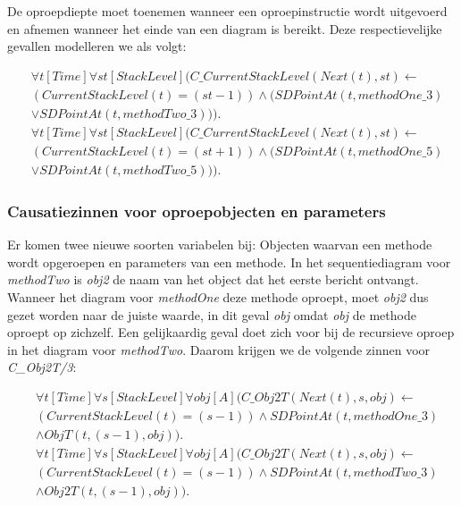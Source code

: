 De oproepdiepte moet toenemen wanneer een oproepinstructie wordt uitgevoerd en afnemen wanneer het einde van een diagram is bereikt. Deze respectievelijke gevallen modelleren we als volgt:

\begin{align}
	\nonumber &\forall{t}[Time]\forall{st}[StackLevel](C\_CurrentStackLevel(Next(t), st) \leftarrow \\ \nonumber &(CurrentStackLevel(t) = (st-1)) \land (SDPointAt(t, methodOne\_3) \\ &\lor SDPointAt(t, methodTwo\_3))). \\
	\nonumber &\forall{t}[Time]\forall{st}[StackLevel](C\_CurrentStackLevel(Next(t), st) \leftarrow \\ \nonumber &(CurrentStackLevel(t) = (st+1)) \land (SDPointAt(t, methodOne\_5) \\ &\lor SDPointAt(t, methodTwo\_5))).
\end{align}

\subsubsection{Causatiezinnen voor oproepobjecten en parameters}
Er komen twee nieuwe soorten variabelen bij: Objecten waarvan een methode wordt opgeroepen en parameters van een methode. In het sequentiediagram voor \textit{methodTwo} is \textit{obj2} de naam van het object dat het eerste bericht ontvangt. Wanneer het diagram voor \textit{methodOne} deze methode oproept, moet \textit{obj2} dus gezet worden naar de juiste waarde, in dit geval \textit{obj} omdat \textit{obj} de methode oproept op zichzelf. Een gelijkaardig geval doet zich voor bij de recursieve oproep in het diagram voor \textit{methodTwo}. Daarom krijgen we de volgende zinnen voor \textit{C\_Obj2T/3}:

\begin{align}
	\nonumber &\forall{t}[Time]\forall{s}[StackLevel]\forall{obj}[A](C\_Obj2T(Next(t), s, obj) \leftarrow
	\\ \nonumber &(CurrentStackLevel(t) = (s-1)) \land SDPointAt(t, methodOne\_3) \\ &\land ObjT(t, (s-1), obj)). \\
	\nonumber &\forall{t}[Time]\forall{s}[StackLevel]\forall{obj}[A](C\_Obj2T(Next(t), s, obj) \leftarrow
	\\ \nonumber &(CurrentStackLevel(t) = (s-1)) \land SDPointAt(t, methodTwo\_3) \\ &\land Obj2T(t, (s-1), obj)).
\end{align}

